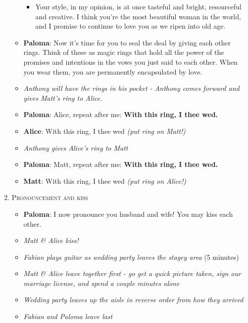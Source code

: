 \documentclass[12pt]{article}
\begin{document}
\begin{enumerate}
\begin{itemize}
\begin{itemize}
    \item Your style, in my opinion, is at once tasteful and bright, resourceful and creative. I think you're the most beautiful woman in the world, and I promise to continue to love you as we ripen into old age.
    \end{itemize}

  \item {\bf Paloma}: Now it's time for you to seal the deal by giving each other rings. Think of these as magic rings that hold all the power of the promises and intentions in the vows you just said to each other. When you wear them, you are permanently encapsulated by love.

  \item \textit{Anthony will have the rings in his pocket - Anthony comes forward and gives Matt's ring to Alice.}

  \item {\bf Paloma}: Alice, repeat after me: \textbf{With this ring, I thee wed.}

  \item {\bf Alice}: With this ring, I thee wed \textit{(put ring on Matt!)}

  \item \textit{Anthony gives Alice's ring to Matt}

  \item {\bf Paloma}: Matt, repeat after me: \textbf{With this ring, I thee wed.}

  \item {\bf Matt}: With this ring, I thee wed \textit{(put ring on Alice!)}
  \end{itemize}

\item \textsc{Pronouncement and kiss}
  \begin{itemize}
  \item {\bf Paloma}: I now pronounce you husband and wife! You may kiss each other. 

  \item \textit{Matt \& Alice kiss!}

  \item \textit{Fabian plays guitar as wedding party leaves the stagey area} (5 minutes)

  \item \textit{Matt \& Alice leave together first - go get a quick picture taken, sign our marriage license, and spend a couple minutes alone}

  \item \textit{Wedding party leaves up the aisle in reverse order from how they arrived}

  \item \textit{Fabian and Paloma leave last}
  \end{itemize}
\end{enumerate}
\end{document}
